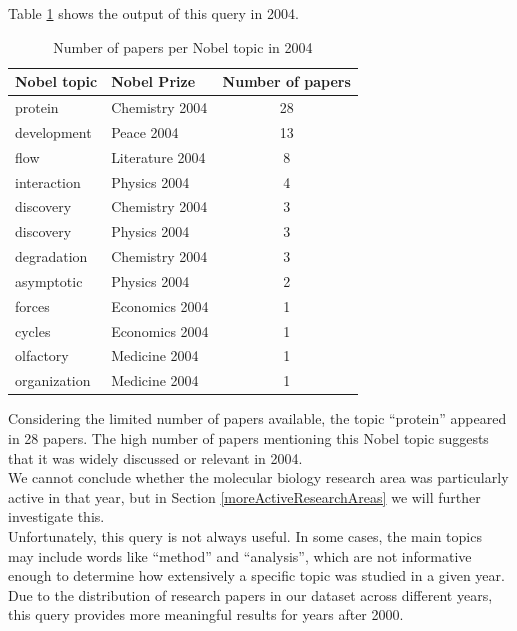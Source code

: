 \documentclass{article}
\begin{document}
Table \ref{tab:papersNobelTopicsYear} shows the output of this query in 2004.

\begin{table}[H]
	\centering
	\caption{Number of papers per Nobel topic in 2004}
	\begin{tabular}{|l|l|c|}
		\hline
		\textbf{Nobel topic} & \textbf{Nobel Prize} & \textbf{Number of papers} \\ \hline
		protein              & Chemistry 2004       & 28                        \\ \hline
		development          & Peace 2004           & 13                        \\ \hline
		flow                 & Literature 2004      & 8                         \\ \hline
		interaction          & Physics 2004         & 4                         \\ \hline
		discovery            & Chemistry 2004       & 3                         \\ \hline
		discovery            & Physics 2004         & 3                         \\ \hline
		degradation          & Chemistry 2004       & 3                         \\ \hline
		asymptotic           & Physics 2004         & 2                         \\ \hline
		forces               & Economics 2004       & 1                         \\ \hline
		cycles               & Economics 2004       & 1                         \\ \hline
		olfactory            & Medicine 2004        & 1                         \\ \hline
		organization         & Medicine 2004        & 1                         \\ \hline
	\end{tabular}
	\label{tab:papersNobelTopicsYear}
\end{table}

\newpage

Considering the limited number of papers available, the topic ``protein'' appeared
in 28 papers. The high number of papers mentioning this Nobel topic suggests that
it was widely discussed or relevant in 2004.\\
We cannot conclude whether the molecular biology research area was particularly active
in that year, but in Section \ref{moreActiveResearchAreas} we will further
investigate this.\\
Unfortunately, this query is not always useful. In some cases, the
main topics may include words like ``method'' and ``analysis'', which are not
informative enough to determine how extensively a specific topic was studied
in a given year.\\
Due to the distribution of research papers in our dataset across different years,
this query provides more meaningful results for years after 2000.
\end{document}
